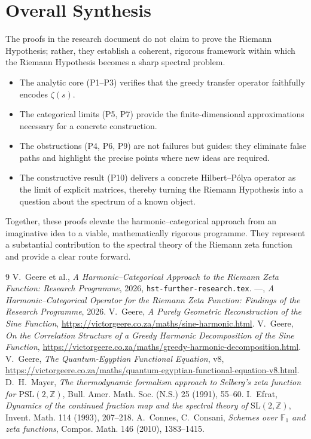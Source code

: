 \documentclass[11pt,a4paper]{article}
\theoremstyle{remark}
\begin{document}
\section{Overall Synthesis}
The proofs in the research document do not claim to prove the Riemann Hypothesis; rather, they establish a coherent, rigorous framework within which the Riemann Hypothesis becomes a sharp spectral problem. 
\begin{itemize}
\item The analytic core (P1--P3) verifies that the greedy transfer operator faithfully encodes $\zeta(s)$.
\item The categorical limits (P5, P7) provide the finite‑dimensional approximations necessary for a concrete construction.
\item The obstructions (P4, P6, P9) are not failures but guides: they eliminate false paths and highlight the precise points where new ideas are required.
\item The constructive result (P10) delivers a concrete Hilbert--Pólya operator as the limit of explicit matrices, thereby turning the Riemann Hypothesis into a question about the spectrum of a known object.
\end{itemize}
Together, these proofs elevate the harmonic–categorical approach from an imaginative idea to a viable, mathematically rigorous programme. They represent a substantial contribution to the spectral theory of the Riemann zeta function and provide a clear route forward.

\begin{thebibliography}{9}
 V.~Geere et al., \emph{A Harmonic–Categorical Approach to the Riemann Zeta Function: Research Programme}, 2026, \texttt{hst-further-research.tex}.
 ---, \emph{A Harmonic–Categorical Operator for the Riemann Zeta Function: Findings of the Research Programme}, 2026.
 V.~Geere, \emph{A Purely Geometric Reconstruction of the Sine Function}, \url{https://victorgeere.co.za/maths/sine-harmonic.html}.
 V.~Geere, \emph{On the Correlation Structure of a Greedy Harmonic Decomposition of the Sine Function}, \url{https://victorgeere.co.za/maths/greedy-harmonic-decomposition.html}.
 V.~Geere, \emph{The Quantum‑Egyptian Functional Equation}, v8, \url{https://victorgeere.co.za/maths/quantum-egyptian-functional-equation-v8.html}.
 D.~H.~Mayer, \emph{The thermodynamic formalism approach to Selberg's zeta function for $\mathrm{PSL}(2,\mathbb{Z})$}, Bull. Amer. Math. Soc. (N.S.) 25 (1991), 55--60.
 I.~Efrat, \emph{Dynamics of the continued fraction map and the spectral theory of $\mathrm{SL}(2,\mathbb{Z})$}, Invent. Math. 114 (1993), 207--218.
 A.~Connes, C.~Consani, \emph{Schemes over $\mathbb{F}_1$ and zeta functions}, Compos. Math. 146 (2010), 1383--1415.
\end{thebibliography}
\end{document}
